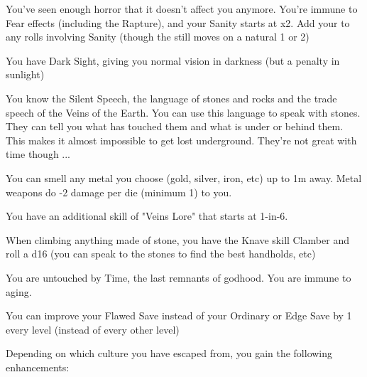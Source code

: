 {  

  You've seen enough horror that it doesn't affect you anymore.  You're immune to Fear effects (including the Rapture), and your Sanity starts at \DCUP x2.  Add your \LVL to any rolls involving Sanity (though the \UD still moves \DCDOWN on a natural 1 or 2)

  You have Dark Sight, giving you normal vision in darkness (but a penalty in sunlight)

  You know the Silent Speech, the language of stones and rocks and the trade speech of the Veins of the Earth.  You can use this language to speak with stones. They can tell you what has touched them and what is under or behind them.  This makes it almost impossible to get lost underground. They're not great with time though ...

  You can smell any metal you choose (gold, silver, iron, etc) up to 1m away.  Metal weapons do -2 damage per die (minimum 1) to you.  

  You have an additional skill of "Veins Lore" that starts at 1-in-6. 



  When climbing anything made of stone, you have the Knave skill Clamber and roll a d16 (you can speak to the stones to find the best handholds, etc)

  You are untouched by Time, the last remnants of godhood.  You are immune to aging.

  You can improve your Flawed Save instead of your Ordinary or Edge Save by 1 every level (instead of every other level)

  Depending on which culture you have escaped from, you gain the following enhancements:

}
